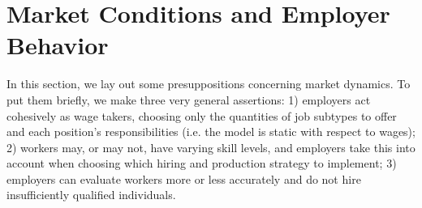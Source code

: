 \documentclass[hidelinks, nonatbib]{elsarticle}
\begin{document}
\section{Market Conditions and Employer Behavior}
In this section, we lay out some presuppositions concerning market dynamics. To put them briefly, we make three very general assertions: 1) employers act cohesively as wage takers, choosing only the quantities of job subtypes to offer and each position's responsibilities (i.e. the model is static with respect to wages); 2) workers may, or may not, have varying skill levels, and employers take this into account when choosing which hiring and production strategy to implement; 3) employers can evaluate workers more or less accurately and do not hire insufficiently qualified individuals.
\end{document}
